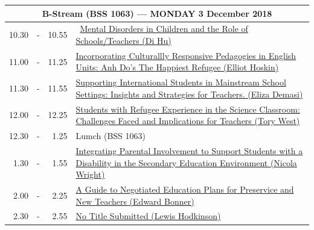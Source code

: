 \documentclass[twoside,12pt,a4paper,notitlepage]{memoir}
\begin{document}
\begin{center}
\begin{tabular}{rcr|p{10.8cm}}
\multicolumn{4}{c}{{\large B-Stream (BSS 1063) --- MONDAY 3 December 2018}} \\ \hline
 10.30 & - & 10.55 & 
\ \hyperref[aut:hu]{Mental Disorders in Children and the Role of Schools/Teachers (Di Hu)} \\ \hline
11.00 & - & 11.25 &
 \hyperref[aut:hoskin]{Incorporating Culturallly Responsive Pedagogies in English Units: Anh Do's The Happiest Refugee (Elliot Hoskin)} \\ \hline
11.30 & - & 11.55 &
 \hyperref[aut:demasi]{Supporting International Students in Mainstream School Settings: Insights and Strategies for Teachers. (Eliza Demasi)} \\ \hline
12.00 & - & 12.25 &
 \hyperref[aut:west]{Students with Refugee Experience in the Science Classroom: Challenges Faced and Implications for Teachers (Tory West)} \\ \hline
12.30 & - & 1.25 & Lumch (BSS 1063) \\ \hline
1.30 & - & 1.55 &
 \hyperref[aut:wright]{Integrating Parental Involvement to Support Students with a Disability in the Secondary Education Environment (Nicola Wright)} \\ \hline
2.00 & - & 2.25 &
 \hyperref[aut:bonner]{A Guide to Negotiated Education Plans for Preservice and New Teachers (Edward Bonner)} \\ \hline
2.30 & - & 2.55 &
 \hyperref[aut:hodkinson]{No Title Submitted (Lewis Hodkinson)} \\ \hline
\end{tabular}
\end{center}
\end{document}
